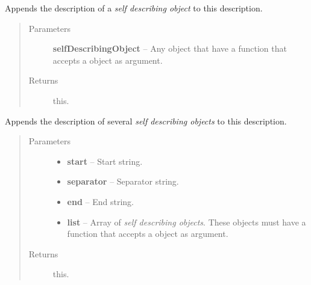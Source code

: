 \documentclass[letterpaper,10pt,english]{sphinxmanual}
\begin{document}

\begin{fulllineitems}
\label{modules/jshamcrest:JsHamcrest.Description.appendDescriptionOf}
Appends the description of a \emph{self describing object} to this description.
\begin{quote}\begin{description}
\item[{Parameters}] \leavevmode
\textbf{selfDescribingObject} -- Any object that have a  function
that accepts a {\hyperref[modules/jshamcrest:JsHamcrest.Description]{}}
object as argument.

\item[{Returns}] \leavevmode
this.

\end{description}\end{quote}

\end{fulllineitems}


\begin{fulllineitems}
\label{modules/jshamcrest:JsHamcrest.Description.appendList}
Appends the description of several \emph{self describing objects} to this
description.
\begin{quote}\begin{description}
\item[{Parameters}] \leavevmode\begin{itemize}
\item {} 
\textbf{start} -- Start string.

\item {} 
\textbf{separator} -- Separator string.

\item {} 
\textbf{end} -- End string.

\item {} 
\textbf{list} -- Array of \emph{self describing objects}. These objects must have
a  function that accepts a
{\hyperref[modules/jshamcrest:JsHamcrest.Description]{}} object as argument.

\end{itemize}

\item[{Returns}] \leavevmode
this.

\end{description}\end{quote}

\end{fulllineitems}
\end{document}
